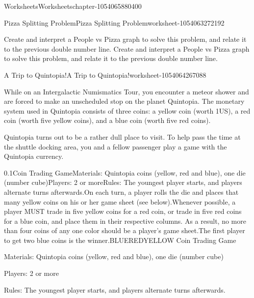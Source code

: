 \documentclass[twoside,11pt,]{book}
\begin{document}
\begin{chapterptx}{Worksheets}{}{Worksheets}{}{}{chapter-1054065880400}
\begin{worksheet-section-numberless}{Pizza Splitting Problem}{}{Pizza Splitting Problem}{}{}{worksheet-1054063272192}
\begin{divisionexercise}{7}{}{}{
        Create and interpret a People vs Pizza graph to solve this problem, and relate it to the previous double number line.
      }
Create and interpret a People vs Pizza graph to solve this problem, and relate it to the previous double number line.%
\end{divisionexercise}%
\end{worksheet-section-numberless}
\restoregeometry
%
%
\typeout{************************************************}
\typeout{************************************************}
%
\begin{worksheet-section-numberless}{A Trip to Quintopia!}{}{A Trip to Quintopia!}{}{}{worksheet-1054064267088}
\begin{introduction}{}%
\hypertarget{p-1054064273008}{}%
While on an Intergalactic Numismatics Tour, you encounter a meteor shower and are forced to make an unscheduled stop on the planet Quintopia.  The monetary system used in Quintopia consists of three coins:  a yellow coin (worth \textdollar{}1US), a red coin (worth five yellow coins), and a blue coin (worth five red coins).%
\par
\hypertarget{p-1054064275632}{}%
Quintopia turns out to be a rather dull place to visit.  To help pass the time at the shuttle docking area, you and a fellow passenger play a game with the Quintopia currency.%
\end{introduction}%
\begin{divisionexercise}{1}{}{0.1}{Coin Trading GameMaterials:  Quintopia coins (yellow, red and blue), one die (number cube)Players:  2 or moreRules:  The youngest player starts, and players alternate turns afterwards.On each turn, a player rolls the die and places that many yellow coins on his or her game sheet (see below).Whenever possible, a player MUST trade in five yellow coins for a red coin, or trade in five red coins for a blue coin, and place them in their respective columns.  As a result, no more than four coins of any one color should be a player’s game sheet.The first player to get two blue coins is the winner.BLUEREDYELLOW}%
\hypertarget{p-1054064282400}{}%
Coin Trading Game%
\par
\hypertarget{p-1054064308512}{}%
Materials:  Quintopia coins (yellow, red and blue), one die (number cube)%
\par
\hypertarget{p-1054064310096}{}%
Players:  2 or more%
\par
\hypertarget{p-1054064317248}{}%
Rules:  The youngest player starts, and players alternate turns afterwards.%
\par
\hypertarget{p-1054064321952}{}%

\end{divisionexercise}
\end{worksheet-section-numberless}
\end{chapterptx}
\end{document}
